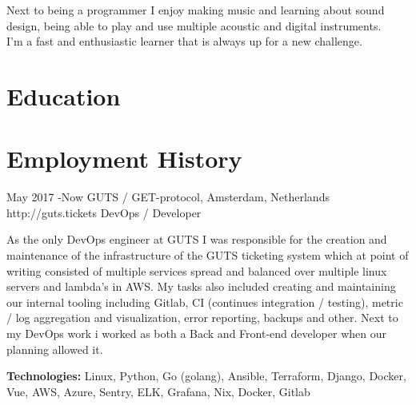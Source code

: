 \documentclass[10pt]{article} %
\begin{document}
Next to being a programmer I enjoy making music and learning about sound design, being able to play and use multiple acoustic and digital instruments. \\

I'm a fast and enthusiastic learner that is always up for a new challenge.


\section{Education}





\section{Employment History}

\job
{May 2017 -}{Now}
{GUTS / GET-protocol, Amsterdam, Netherlands}
{http://guts.tickets}
{DevOps / Developer}
{As the only DevOps engineer at GUTS I was responsible for the creation and maintenance of the infrastructure of the GUTS ticketing system which at point of writing consisted of multiple services spread and balanced over multiple linux servers and lambda's in AWS. My tasks also included creating and maintaining our internal tooling including Gitlab, CI (continues integration / testing), metric / log aggregation and visualization, error reporting, backups and other. Next to my DevOps work i worked as both a Back and Front-end developer when our planning allowed it.

\rule{0mm}{5mm}\textbf{Technologies:} Linux, Python, Go (golang), Ansible, Terraform, Django, Docker, Vue, AWS, Azure, Sentry, ELK, Grafana, Nix, Docker, Gitlab }
\end{document}

